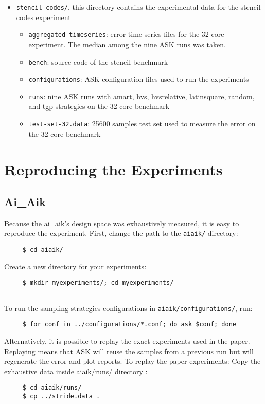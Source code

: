 \begin{itemize}
	\item \texttt{stencil-codes/}, this directory contains the experimental data for the stencil codes experiment
	\begin{itemize}
		\item \texttt{aggregated-timeseries}: error time series files for the 32-core experiment. The median among the nine ASK runs was taken.
		\item \texttt{bench}: source code of the stencil benchmark
		\item \texttt{configurations}: ASK configuration files used to run the experiments
		\item \texttt{runs}: nine ASK runs with amart, hvs, hvsrelative, latinsquare, random, and tgp strategies on the 32-core benchmark
		\item \texttt{test-set-32.data}: 25600 samples test set used to measure the error on the 32-core benchmark
	\end{itemize}
\end{itemize}

\section{Reproducing the Experiments}

\subsection{Ai\_Aik}

Because the ai\_aik's design space was exhaustively measured, it is easy to reproduce the experiment.
First, change the path to the \texttt{aiaik/} directory:
\begin{verbatim}
	 $ cd aiaik/
\end{verbatim}
Create a new directory for your experiments:
\begin{verbatim}
	 $ mkdir myexperiments/; cd myexperiments/
	
\end{verbatim}
To run the sampling strategies configurations in \texttt{aiaik/configurations/}, run:
\begin{verbatim}
	 $ for conf in ../configurations/*.conf; do ask $conf; done
\end{verbatim}

Alternatively, it is possible to replay the exact experiments used in the paper. Replaying means that
ASK will reuse the samples from a previous run but will regenerate the error and plot reports. 
To replay the paper experiments:
Copy the exhaustive data inside aiaik/runs/ directory :
\begin{verbatim}
	 $ cd aiaik/runs/
	 $ cp ../stride.data .
\end{verbatim}

